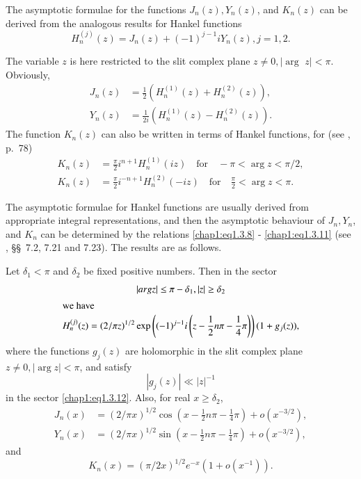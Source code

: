 The asymptotic formulae for the functions $J_n(z), Y_n(z)$, and
$K_n(z)$ can be derived from the analogous results for Hankel
functions 
\begin{equation}\label{chap1:eq1.3.7}
H_n^{(j)}(z)=J_n(z)+(-1)^{j-1}iY_n(z), j=1,2.
\end{equation}

The variable $z$ is here restricted to the slit complex plane $z\neq
0, |\arg$ $z|<\pi$. Obviously,
\begin{align}
J_n(z) &= \frac{1}{2}\left( H_n^{(1)}(z)+H_n^{(2)}(z)
\right),\label{chap1:eq1.3.8}\\ 
Y_n(z) &= \frac{1}{2i}\left(H_n^{(1)}(z)-H_n^{(2)}(z)
\right).\label{chap1:eq1.3.9} 
\end{align}
The function $K_n(z)$ can also be written in terms of Hankel
functions, for (see \cite{key29}, p.~78) 
\begin{align}
K_n(z) &= \frac{\pi}{2}i^{n+1}H_n^{(1)}(iz)\quad\text{for}\quad -\pi <
\arg z<\pi/2,\label{chap1:eq1.3.10}\\
K_n(z) &= \frac{\pi}{2}i^{-n+1}H_n^{(2)}(-iz)\quad\text{for}\quad
\frac{\pi}{2} < \arg z < \pi.\label{chap1:eq1.3.11}
\end{align}\pageoriginale

The asymptotic formulae for Hankel functions are usually derived from
appropriate integral representations, and then the asymptotic
behaviour of $J_n, Y_n$, and $K_n$ can be determined by the relations
\eqref{chap1:eq1.3.8} - \eqref{chap1:eq1.3.11} (see \cite{key29},
\S\S~7.2, 7.21 and 7.23). The results are as follows.
\begin{lem}\label{chap1:lem1.4}
Let $\delta_1<\pi$ and $\delta_2$ be fixed positive numbers. Then in
the sector
\begin{gather}
|arg z|\leq\pi -\delta_1, |z|\geq\delta_2\label{chap1:eq1.3.12}\\ 
\intertext{we have}
H_n^{(j)}(z)=(2/\pi z)^{1/2} \exp\left((-1)^{j-1}i\left(z-\frac{1}{2}n\pi
-\frac{1}{4}\pi\right)\right)(1+g_j(z)),\label{chap1:eq1.3.13} 
\end{gather}
where the functions $g_j(z)$ are holomorphic in the slit complex plane
$z\neq 0, |\arg z|<\pi$, and satisfy
\begin{equation}\label{chap1:eq1.3.14}
|g_j(z)|\ll |z|^{-1}
\end{equation}
in the sector \eqref{chap1:eq1.3.12}. Also, for real $x\geq\delta_2$,
\begin{align}
J_n(x) &= (2/\pi x)^{1/2}\cos\left(x-\frac{1}{2}n\pi-\frac{1}{4}\pi
\right)+o(x^{-3/2}),\label{chap1:eq1.3.15}\\
Y_n(x) &= (2/\pi x)^{1/2}\sin\left(x-\frac{1}{2}n\pi-\frac{1}{4} \pi
\right)+o(x^{-3/2}),\label{chap1:eq1.3.16}
\end{align}
and
\begin{equation}\label{chap1:eq1.3.17}
K_n(x)=(\pi/2x)^{1/2}e^{-x}\left(1+o(x^{-1})\right).
\end{equation}
\end{lem}

